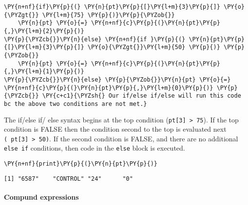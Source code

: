     \begin{tcolorbox}[breakable, size=fbox, boxrule=1pt, pad at break*=1mm,colback=cellbackground, colframe=cellborder]
\begin{Verbatim}[commandchars=\\\{\}]
\PY{n+nf}{if}\PY{p}{(} \PY{n}{pt}\PY{p}{[}\PY{l+m}{3}\PY{p}{]} \PY{o}{\PYZgt{}} \PY{l+m}{75} \PY{p}{)}\PY{p}{\PYZob{}}  
    \PY{n}{pt} \PY{o}{=} \PY{n+nf}{c}\PY{p}{(}\PY{n}{pt}\PY{p}{,}\PY{l+m}{2}\PY{p}{)}
\PY{p}{\PYZcb{}}\PY{n}{else} \PY{n+nf}{if }\PY{p}{(} \PY{n}{pt}\PY{p}{[}\PY{l+m}{3}\PY{p}{]} \PY{o}{\PYZgt{}}\PY{l+m}{50} \PY{p}{)} \PY{p}{\PYZob{}}
    \PY{n}{pt} \PY{o}{=} \PY{n+nf}{c}\PY{p}{(}\PY{n}{pt}\PY{p}{,}\PY{l+m}{1}\PY{p}{)}
\PY{p}{\PYZcb{}}\PY{n}{else} \PY{p}{\PYZob{}}\PY{n}{pt} \PY{o}{=} \PY{n+nf}{c}\PY{p}{(}\PY{n}{pt}\PY{p}{,}\PY{l+m}{0}\PY{p}{)} \PY{p}{\PYZcb{}} \PY{c+c1}{\PYZsh{} Our if/else if/else will run this code bc the above two conditions are not met.}
\end{Verbatim}
\end{tcolorbox}

    The if/else if/ else syntax begins at the top condition
(\texttt{pt{[}3{]}\ \textgreater{}\ 75}). If the top condition is FALSE
then the condition second to the top is evaluated next
\texttt{(\ pt{[}3{]}\ \textgreater{}\ 50)}. If the second condition is
FALSE, and there are no additional \texttt{else\ if} conditions, then
code in the \texttt{else} block is executed.

    \begin{tcolorbox}[breakable, size=fbox, boxrule=1pt, pad at break*=1mm,colback=cellbackground, colframe=cellborder]
\begin{Verbatim}[commandchars=\\\{\}]
\PY{n+nf}{print}\PY{p}{(}\PY{n}{pt}\PY{p}{)}
\end{Verbatim}
\end{tcolorbox}

    \begin{Verbatim}[commandchars=\\\{\}]
[1] "6587"    "CONTROL" "24"      "0"
    \end{Verbatim}

    \hypertarget{compund-expressions}{%
\paragraph{Compund expressions}\label{compund-expressions}}

